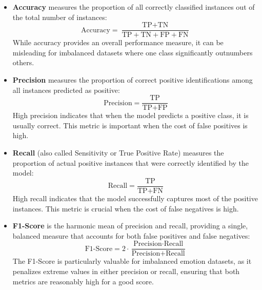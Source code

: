 \begin{itemize}
    \item \textbf{Accuracy} measures the proportion of all correctly classified instances out of the total number of instances:
    \begin{equation}
    \text{Accuracy} = \frac{\text{TP} + \text{TN}}{\text{TP} + \text{TN} + \text{FP} + \text{FN}}
    \end{equation}
    While accuracy provides an overall performance measure, it can be misleading for imbalanced datasets where one class significantly outnumbers others.
    
    \item \textbf{Precision} measures the proportion of correct positive identifications among all instances predicted as positive:
    \begin{equation}
    \text{Precision} = \frac{\text{TP}}{\text{TP} + \text{FP}}
    \end{equation}
    High precision indicates that when the model predicts a positive class, it is usually correct. This metric is important when the cost of false positives is high.
    
    \item \textbf{Recall} (also called Sensitivity or True Positive Rate) measures the proportion of actual positive instances that were correctly identified by the model:
    \begin{equation}
    \text{Recall} = \frac{\text{TP}}{\text{TP} + \text{FN}}
    \end{equation}
    High recall indicates that the model successfully captures most of the positive instances. This metric is crucial when the cost of false negatives is high.
    
    \item \textbf{F1-Score} is the harmonic mean of precision and recall, providing a single, balanced measure that accounts for both false positives and false negatives:
    \begin{equation}
    \text{F1-Score} = 2 \cdot \frac{\text{Precision} \cdot \text{Recall}}{\text{Precision} + \text{Recall}}
    \end{equation}
    The F1-Score is particularly valuable for imbalanced emotion datasets, as it penalizes extreme values in either precision or recall, ensuring that both metrics are reasonably high for a good score.
\end{itemize}
